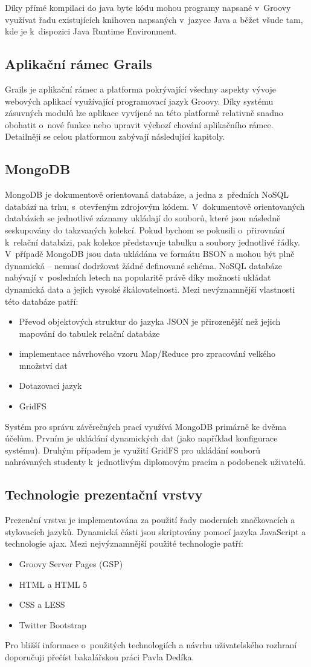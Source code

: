 Díky přímé kompilaci do java byte kódu mohou programy napsané v~Groovy využívat řadu existujících knihoven napsaných v~jazyce Java a běžet všude tam, kde je k~dispozici Java Runtime Environment.

\subsection{Aplikační rámec Grails}
Grails je aplikační rámec a platforma pokrývající všechny aspekty vývoje webových aplikací využívající programovací jazyk Groovy. Díky systému zásuvných modulů lze aplikace vyvíjené na této platformě relativně snadno obohatit o~nové funkce nebo upravit výchozí chování aplikačního rámce. Detailněji se celou platformou zabývají následující kapitoly.

\subsection{MongoDB}
MongoDB je dokumentově orientovaná databáze, a jedna z~předních NoSQL databází na trhu, s~otevřeným zdrojovým kódem. V~dokumentově orientovaných databázích se jednotlivé záznamy ukládají do souborů, které jsou následně seskupovány do takzvaných kolekcí. Pokud bychom se pokusili o~přirovnání k~relační databázi, pak kolekce představuje tabulku a soubory jednotlivé řádky. V~případě MongoDB jsou data ukládána ve formátu BSON a mohou být plně dynamická -- nemusí dodržovat žádné definované schéma. NoSQL databáze nabývají v~posledních letech na popularitě právě díky možnosti ukládat dynamická data a jejich vysoké škálovatelnosti. Mezi nevýznamnější vlastnosti této databáze patří:

\begin{itemize}
\item Převod objektových struktur do jazyka JSON je přirozenější než jejich mapování do tabulek relační databáze
\item implementace návrhového vzoru Map/Reduce pro zpracování velkého množství dat
\item Dotazovací jazyk
\item GridFS
\end{itemize}

Systém pro správu závěrečných prací využívá MongoDB primárně ke dvěma účelům. Prvním je ukládání dynamických dat (jako například konfigurace systému). Druhým případem je využití GridFS pro ukládání souborů nahrávaných studenty k~jednotlivým diplomovým pracím a podobenek uživatelů.


\subsection{Technologie prezentační vrstvy}
Prezenční vrstva je implementována za použití řady moderních značkovacích a stylovacích jazyků. Dynamická části jsou skriptovány pomocí jazyka JavaScript a technologie ajax. Mezi nejvýznamnější použité technologie patří:

\begin{itemize}
\item  Groovy Server Pages (GSP)
\item HTML a HTML 5
\item  CSS a LESS
\item Twitter Bootstrap
\end{itemize}

Pro bližší informace o~použitých technologiích a návrhu uživatelského rozhraní doporučuji přečíst bakalářskou práci Pavla Dedíka.
